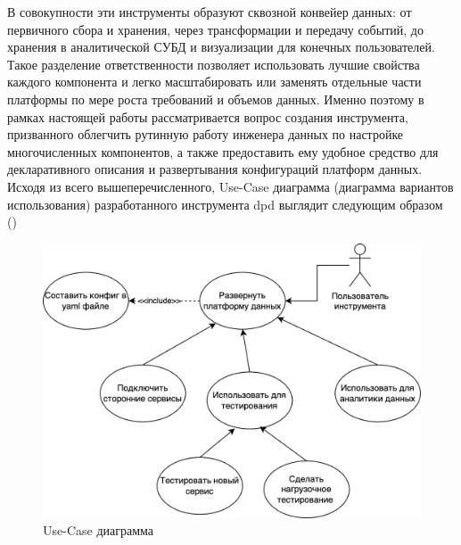 В совокупности эти инструменты образуют сквозной конвейер данных: от первичного сбора и хранения, через трансформации и передачу событий, до хранения в аналитической СУБД и визуализации для конечных пользователей. Такое разделение ответственности позволяет использовать лучшие свойства каждого компонента и легко масштабировать или заменять отдельные части платформы по мере роста требований и объемов данных.
Именно поэтому в рамках настоящей работы рассматривается вопрос создания инструмента, призванного облегчить рутинную работу инженера данных по настройке многочисленных компонентов, а также предоставить ему удобное средство для декларативного описания и развертывания конфигураций платформ данных.
Исходя из всего вышеперечисленного, Use-Case диаграмма (диаграмма вариантов использования) разработанного инструмента dpd выглядит следующим образом ()
\begin{figure}[ht]
	\center
	\includegraphics [scale=0.4] {my_folder/images/diagram_usecase}
	\caption{Use-Case диаграмма}
	\label{fig:diagram_usecase}
\end{figure}





